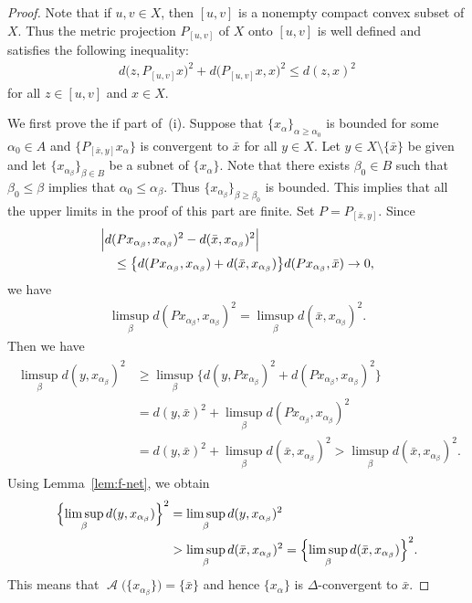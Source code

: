 \documentclass[draft]{amsart}
\numberwithin{equation}{section}
\DeclareMathOperator{\AC}{\mathcal{A}}
\theoremstyle{plain}
\theoremstyle{definition}
\theoremstyle{remark}
\begin{document}
\begin{proof}
 Note that if $u,v\in X$, then 
 $[u,v]$ is a nonempty compact convex subset of $X$. 
 Thus the metric projection $P_{[u,v]}$ of $X$ onto $[u,v]$ 
 is well defined and 
 satisfies the following inequality: 
 \begin{align}
  d\bigl(z, P_{[u,v]}x\bigr)^2 + d\bigl(P_{[u,v]}x, x\bigr)^2 
  \leq d(z, x)^2
 \end{align}
 for all $z\in [u,v]$ and $x\in X$. 
 
 We first prove the if part of~(i). 
 Suppose that $\{x_{\alpha}\}_{\alpha \geq \alpha_0}$ is bounded 
 for some $\alpha_0\in A$ and 
 $\{P_{[\bar{x},y]}x_{\alpha}\}$ is convergent to $\bar{x}$ 
 for all $y\in X$. Let $y\in X\setminus \{\bar{x}\}$ be given 
 and let $\{x_{\alpha_{\beta}}\}_{\beta\in B}$ be a subnet of $\{x_{\alpha}\}$. 
 Note that there exists $\beta_0\in B$ such that 
 $\beta_0\leq \beta$ implies that $\alpha_0\leq \alpha_{\beta}$. 
 Thus $\{x_{\alpha_{\beta}}\}_{\beta\geq \beta_0}$ is bounded. 
 This implies that all the upper limits in the proof of 
 this part are finite. 
 Set $P=P_{[\bar{x},y]}$. 
 Since 
 \begin{align}
 \begin{split}
  &\Bigl\lvert 
  d(Px_{\alpha_{\beta}},x_{\alpha_{\beta}})^2 - d(\bar{x},x_{\alpha_{\beta}})^2
  \Bigr\lvert \\
  &\quad \leq 
  \bigl\{
   d(Px_{\alpha_{\beta}},x_{\alpha_{\beta}}) + d(\bar{x},x_{\alpha_{\beta}})
  \bigr\}
    d(Px_{\alpha_{\beta}},\bar{x})  \to 0, 
 \end{split}
 \end{align}
 we have 
 \begin{align}
  \limsup_{\beta}d(Px_{\alpha_{\beta}},x_{\alpha_{\beta}})^2 
  =\limsup_{\beta}d(\bar{x},x_{\alpha_{\beta}})^2. 
 \end{align}
 Then we have 
 \begin{align}
  \begin{split}
   \limsup_{\beta}d(y,x_{\alpha_{\beta}})^2 
   &\geq    \limsup_{\beta}
  \bigl\{
   d(y,Px_{\alpha_{\beta}})^2 + d(Px_{\alpha_{\beta}},x_{\alpha_{\beta}})^2 
  \bigr\} \\
   &=    d(y,\bar{x})^2 
 +\limsup_{\beta}
  d(Px_{\alpha_{\beta}},x_{\alpha_{\beta}})^2 \\
   &=    d(y,\bar{x})^2 
 +\limsup_{\beta}
  d(\bar{x},x_{\alpha_{\beta}})^2 
   >
 \limsup_{\beta}
  d(\bar{x},x_{\alpha_{\beta}})^2. 
  \end{split}
 \end{align}
Using Lemma~\ref{lem:f-net}, we obtain 
\begin{align}
 \begin{split}
\Bigl\{\limsup_{\beta}d(y,x_{\alpha_{\beta}})\Bigr\}^2 
 &=\limsup_{\beta}d(y,x_{\alpha_{\beta}})^2 \\
 &> \limsup_{\beta}d(\bar{x},x_{\alpha_{\beta}})^2
 = \Bigl\{\limsup_{\beta}d(\bar{x},x_{\alpha_{\beta}})\Bigr\}^2. 
 \end{split}
\end{align}
 This means that 
 $\AC\bigl(\{x_{\alpha_{\beta}}\}\bigr)=\{\bar{x}\}$ 
 and hence $\{x_{\alpha}\}$ is $\Delta$-convergent to $\bar{x}$. 


\end{proof}
\end{document}
